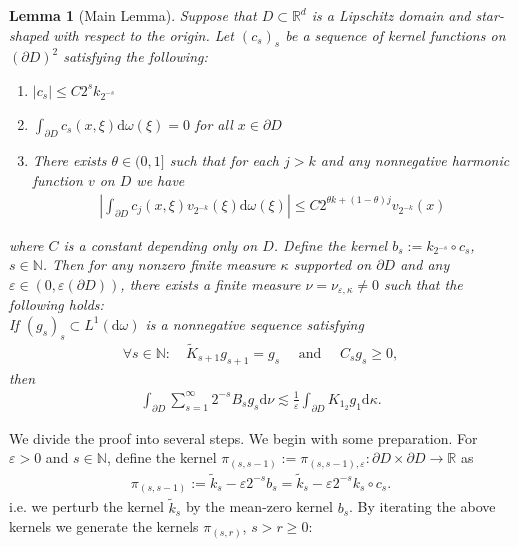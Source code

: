\documentclass[a4paper,12pt]{article}
\newtheorem{lemma}[theorem]{Lemma}
\theoremstyle{definition}
\theoremstyle{definition}
\begin{document}
	\begin{lemma}[Main Lemma]\label{lem:main_lemma}
		Suppose that $D\subset\mathbb R^d$ is a Lipschitz domain and star-shaped with respect to the origin. Let $(c_s)_s$ be a sequence of kernel functions on $(\partial D)^2$ satisfying the following:
		\begin{enumerate}
			\item $|c_s|\leq C2^sk_{2^{-s}}$
			\item $\int_{\partial D}c_s(x,\xi)\mathrm d\omega(\xi)=0$ for all $x\in\partial D$
			\item There exists $\theta\in(0,1]$ such that for each $j>k$ and any nonnegative harmonic function $v$ on $D$ we have 
			\begin{align}\label{eq:c_main_prop}
				\left|\int_{\partial D}c_j(x,\xi)v_{2^{-k}}(\xi)\mathrm d\omega(\xi)\right| \leq C2^{\theta k+(1-\theta)j}v_{2^{-k}}(x)
			\end{align}
		\end{enumerate}
		where $C$ is a constant depending only on $D$.
		Define the kernel $b_s:= k_{2^{-s}}\circ c_s$, $s\in\mathbb N$.
		Then for any nonzero finite measure $\kappa$ supported on $\partial D$ and any $\varepsilon\in(0,\varepsilon(\partial D))$, there exists a finite measure $\nu=\nu_{\varepsilon,\kappa}\neq0$ such that the following holds:\\
		If  $(g_s)_s\subset L^1(\mathrm d\omega)$ is a nonnegative sequence satisfying 
		\begin{align}\label{cond:gs}
			\forall s\in\mathbb{N}:\quad \tilde K_{s+1}g_{s+1}=g_s\quad\text{ and } \quad C_sg_s\geq0,
		\end{align}
		then
		\begin{align*}
			\int_{\partial D} \sum_{s=1}^\infty 2^{-s} B_sg_s\mathrm{d}\nu\lesssim\frac{1}{\varepsilon}\int_{\partial D} K_{1_2}g_1\mathrm d \kappa.
		\end{align*}
		\end{lemma}		
		We divide the proof into several steps. We begin with some preparation. For $\varepsilon>0$ and $s\in\mathbb N$, define the kernel $\pi_{(s,s-1)}:=\pi_{(s,s-1),\varepsilon}:{\partial D}\times {\partial D}\longrightarrow\mathbb{R}$ as
		\begin{align*}
			\pi_{(s,s-1)}:=\tilde k_s-\varepsilon 2^{-s}b_s =\tilde k_s-\varepsilon 2^{-s}k_s\circ c_s.
		\end{align*}
		i.e. we perturb the kernel $\tilde k_s$ by the mean-zero kernel $b_s$. By iterating the above kernels we generate the kernels $\pi_{(s,r)}$, $s>r\geq0$:
\end{document}
